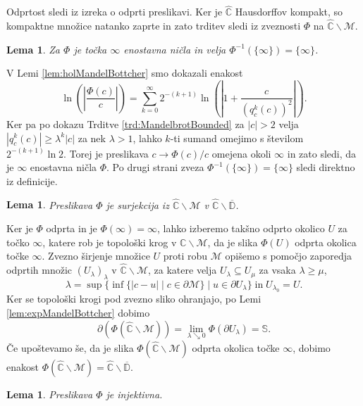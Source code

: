 \documentclass[12pt,a4paper]{amsart}
\theoremstyle{definition} %
\theoremstyle{plain} %
\newtheorem{lema}[definicija]{Lema}
\newcommand{\CC}{\mathbb C}
\newcommand{\CCinf} {\hat{\CC}} %
\newcommand{\D}{\mathbb D} %
\newcommand{\SSS}{\mathbb S} %
\newcommand{\M}{\mathscr M} %
\begin{document}
\proof
Odprtost sledi iz izreka o odprti preslikavi.
Ker je $\CCinf$ Hausdorffov kompakt, so kompaktne množice natanko zaprte
in zato trditev sledi iz zveznosti $\Phi$ na $\CCinf \smallsetminus \M$.
\endproof

\begin{lema}\label{lem:infinityZeroMandelBottcher}
Za $\Phi$ je točka $\infty$ enostavna ničla in velja $\Phi^{-1}(\{\infty\}) = \{\infty\}$.
\end{lema}

\proof
V Lemi \ref{lem:holMandelBottcher} smo dokazali enakost
$$\ln\left(\left|\frac{\Phi(c)}{c}\right|\right) = \sum_{k=0}^\infty 2^{-(k+1)} \ln\left(\left|1 + \frac{c}{(q_c^k(c))^2}\right|\right).$$
Ker pa po dokazu Trditve \ref{trd:MandelbrotBounded} za $|c| > 2$ velja
$|q_c^k(c)| \geq \lambda^k |c|$
za nek $\lambda > 1$, lahko $k$-ti sumand omejimo s številom $2^{-(k+1)}\ln2$.
Torej je preslikava $c \to \Phi(c) / c$ omejena okoli $\infty$ in zato sledi, da je $\infty$ enostavna ničla
$\Phi$. Po drugi strani zveza $\Phi^{-1}(\{\infty\}) = \{\infty\}$ sledi direktno iz definicije.
\endproof

\begin{lema}
Preslikava $\Phi$ je surjekcija iz $\CCinf \smallsetminus \M$ v $\CCinf \smallsetminus \overline{\D}$.
\end{lema}

\proof
Ker je $\Phi$ odprta in je $\Phi(\infty) = \infty$, 
lahko izberemo takšno odprto okolico $U$ za točko $\infty$, katere rob je topološki krog v $\CC \smallsetminus \M$,
da je slika $\Phi(U)$ odprta okolica točke $\infty$.
Zvezno širjenje množice $U$ proti robu $\M$ opišemo s pomočjo zaporedja odprtih množic 
$(U_\lambda)_\lambda$ v $\CCinf \smallsetminus \M$, za katere velja $U_\lambda \subseteq U_\mu$ za vsaka $\lambda \geq \mu$,
$$\lambda = \sup\{\inf\{|c - u| \mid c \in \partial\M\} \mid u \in \partial U_\lambda\} \; \text{in} \; U_{\lambda_0} = U.$$
Ker se topološki krogi pod zvezno sliko ohranjajo, po Lemi \ref{lem:expMandelBottcher} dobimo
$$\partial (\Phi(\CCinf \smallsetminus \M)) = \lim_{\lambda\searrow0}\Phi\left(\partial U_\lambda\right) = \SSS.$$
Če upoštevamo še, da je slika $\Phi(\CCinf \smallsetminus \M)$ odprta okolica točke $\infty$, 
dobimo enakost  $\Phi(\CCinf \smallsetminus \M) = \CCinf \smallsetminus \overline{\D}.$
\endproof

\begin{lema}
Preslikava $\Phi$ je injektivna.
\end{lema}
\end{document}
